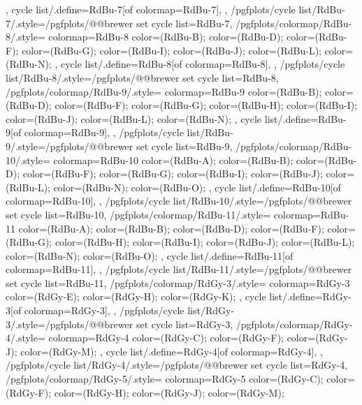 {{{    },
    cycle list/.define={RdBu-7}{[of colormap=RdBu-7]},
  },
  /pgfplots/cycle list/RdBu-7/.style={/pgfplots/@@brewer set cycle list={RdBu-7}},
  /pgfplots/colormap/RdBu-8/.style={
    colormap={RdBu-8}{
      color=(RdBu-B);
      color=(RdBu-D);
      color=(RdBu-F);
      color=(RdBu-G);
      color=(RdBu-I);
      color=(RdBu-J);
      color=(RdBu-L);
      color=(RdBu-N);
    },
    cycle list/.define={RdBu-8}{[of colormap=RdBu-8]},
  },
  /pgfplots/cycle list/RdBu-8/.style={/pgfplots/@@brewer set cycle list={RdBu-8}},
  /pgfplots/colormap/RdBu-9/.style={
    colormap={RdBu-9}{
      color=(RdBu-B);
      color=(RdBu-D);
      color=(RdBu-F);
      color=(RdBu-G);
      color=(RdBu-H);
      color=(RdBu-I);
      color=(RdBu-J);
      color=(RdBu-L);
      color=(RdBu-N);
    },
    cycle list/.define={RdBu-9}{[of colormap=RdBu-9]},
  },
  /pgfplots/cycle list/RdBu-9/.style={/pgfplots/@@brewer set cycle list={RdBu-9}},
  /pgfplots/colormap/RdBu-10/.style={
    colormap={RdBu-10}{
      color=(RdBu-A);
      color=(RdBu-B);
      color=(RdBu-D);
      color=(RdBu-F);
      color=(RdBu-G);
      color=(RdBu-I);
      color=(RdBu-J);
      color=(RdBu-L);
      color=(RdBu-N);
      color=(RdBu-O);
    },
    cycle list/.define={RdBu-10}{[of colormap=RdBu-10]},
  },
  /pgfplots/cycle list/RdBu-10/.style={/pgfplots/@@brewer set cycle list={RdBu-10}},
  /pgfplots/colormap/RdBu-11/.style={
    colormap={RdBu-11}{
      color=(RdBu-A);
      color=(RdBu-B);
      color=(RdBu-D);
      color=(RdBu-F);
      color=(RdBu-G);
      color=(RdBu-H);
      color=(RdBu-I);
      color=(RdBu-J);
      color=(RdBu-L);
      color=(RdBu-N);
      color=(RdBu-O);
    },
    cycle list/.define={RdBu-11}{[of colormap=RdBu-11]},
  },
  /pgfplots/cycle list/RdBu-11/.style={/pgfplots/@@brewer set cycle list={RdBu-11}},
  /pgfplots/colormap/RdGy-3/.style={
    colormap={RdGy-3}{
      color=(RdGy-E);
      color=(RdGy-H);
      color=(RdGy-K);
    },
    cycle list/.define={RdGy-3}{[of colormap=RdGy-3]},
  },
  /pgfplots/cycle list/RdGy-3/.style={/pgfplots/@@brewer set cycle list={RdGy-3}},
  /pgfplots/colormap/RdGy-4/.style={
    colormap={RdGy-4}{
      color=(RdGy-C);
      color=(RdGy-F);
      color=(RdGy-J);
      color=(RdGy-M);
    },
    cycle list/.define={RdGy-4}{[of colormap=RdGy-4]},
  },
  /pgfplots/cycle list/RdGy-4/.style={/pgfplots/@@brewer set cycle list={RdGy-4}},
  /pgfplots/colormap/RdGy-5/.style={
    colormap={RdGy-5}{
      color=(RdGy-C);
      color=(RdGy-F);
      color=(RdGy-H);
      color=(RdGy-J);
      color=(RdGy-M);
}}}

